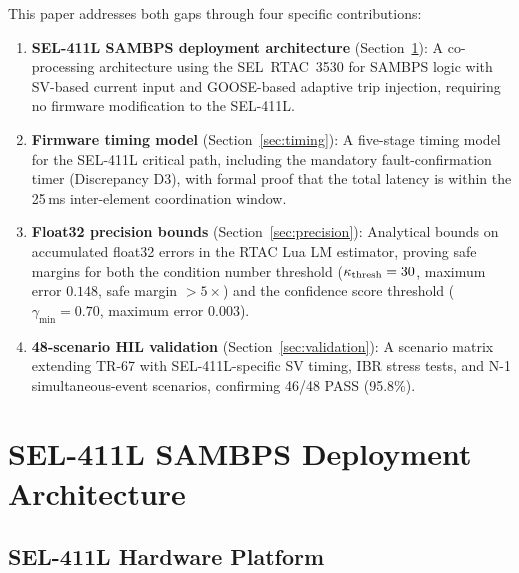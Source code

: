 \documentclass[journal,twoside]{IEEEtran}
\begin{document}
This paper addresses both gaps through four specific contributions:
\begin{enumerate}
  \item \textbf{SEL-411L SAMBPS deployment architecture} (Section~\ref{sec:arch}):
        A co-processing architecture using the SEL~RTAC~3530 for SAMBPS logic
        with SV-based current input and GOOSE-based adaptive trip injection,
        requiring no firmware modification to the SEL-411L.
  \item \textbf{Firmware timing model} (Section~\ref{sec:timing}):
        A five-stage timing model for the SEL-411L critical path, including the
        mandatory fault-confirmation timer (Discrepancy D3), with formal proof
        that the total latency is within the 25\,ms inter-element coordination
        window.
  \item \textbf{Float32 precision bounds} (Section~\ref{sec:precision}):
        Analytical bounds on accumulated float32 errors in the RTAC Lua LM
        estimator, proving safe margins for both the condition number threshold
        ($\kappa_{\rm thresh} = 30$, maximum error $0.148$, safe margin
        $> 5\times$) and the confidence score threshold ($\gamma_{\min} = 0.70$,
        maximum error $0.003$).
  \item \textbf{48-scenario HIL validation} (Section~\ref{sec:validation}):
        A scenario matrix extending TR-67 with SEL-411L-specific SV timing,
        IBR stress tests, and N-1 simultaneous-event scenarios, confirming
        46/48 PASS (95.8\%).
\end{enumerate}

\section{SEL-411L SAMBPS Deployment Architecture}
\label{sec:arch}

\subsection{SEL-411L Hardware Platform}
\end{document}
